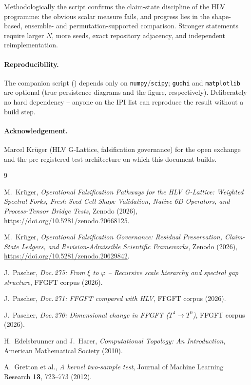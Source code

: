Methodologically the script confirms the claim-state discipline of the HLV
programme: the obvious scalar measure fails, and progress lies in the
shape-based, ensemble- and permutation-supported comparison. Stronger
statements require larger $N$, more seeds, exact repository adjacency, and
independent reimplementation.

\paragraph{Reproducibility.} The companion script
() depends only on
\texttt{numpy}/\texttt{scipy}; \texttt{gudhi} and \texttt{matplotlib} are
optional (true persistence diagrams and the figure, respectively).
Deliberately no hard dependency -- anyone on the IPI list can reproduce the
result without a build step.

\paragraph{Acknowledgement.} Marcel Krüger (HLV G-Lattice, falsification
governance) for the open exchange and the pre-registered test architecture on
which this document builds.

\begin{thebibliography}{9}

M.~Krüger,
\emph{Operational Falsification Pathways for the HLV G-Lattice:
Weighted Spectral Forks, Fresh-Seed Cell-Shape Validation, Native 6D
Operators, and Process-Tensor Bridge Tests},
Zenodo (2026), \url{https://doi.org/10.5281/zenodo.20668125}.

M.~Krüger,
\emph{Operational Falsification Governance: Residual Preservation,
Claim-State Ledgers, and Revision-Admissible Scientific Frameworks},
Zenodo (2026), \url{https://doi.org/10.5281/zenodo.20629842}.

J.~Pascher, \emph{Doc.\,275: From $\xi$ to $\varphi$ -- Recursive scale
hierarchy and spectral gap structure}, FFGFT corpus (2026).

J.~Pascher, \emph{Doc.\,271: FFGFT compared with HLV}, FFGFT corpus (2026).

J.~Pascher, \emph{Doc.\,270: Dimensional change in FFGFT
($T^4 \to T^0$)}, FFGFT corpus (2026).

H.~Edelsbrunner and J.~Harer, \emph{Computational Topology: An
Introduction}, American Mathematical Society (2010).

A.~Gretton et al., \emph{A kernel two-sample test},
Journal of Machine Learning Research \textbf{13}, 723--773 (2012).

\end{thebibliography}
